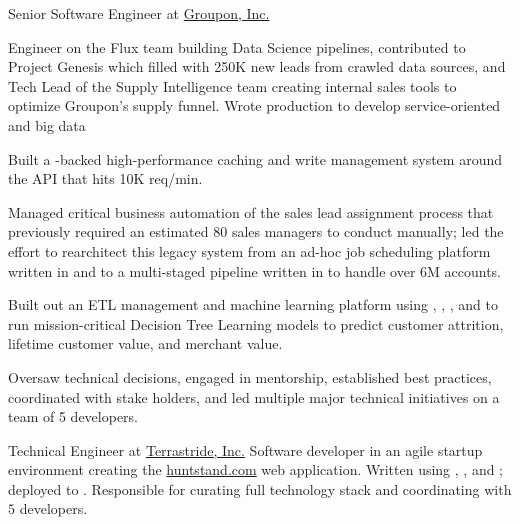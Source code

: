 \documentclass[10pt]{article}
\begin{document}
%
{Senior Software Engineer}%
{at}%
{\href{http://www.groupon.com}{Groupon, Inc.}}%
{Engineer on the Flux team building Data Science pipelines,
  contributed to Project Genesis which filled \salesforce with 250K
  new leads from crawled data sources, and Tech Lead of the Supply
  Intelligence team creating internal sales tools to optimize
  Groupon's supply funnel. Wrote production \clojure to develop
  service-oriented and big data
  \begin{exlist}

  \item Built a \postgres-backed high-performance caching and write
    management system around the \salesforce API that hits 10K
    req/min.

  \item Managed critical business automation of the sales lead
    assignment process that previously required an estimated 80
    sales managers to conduct manually; led the effort to
    rearchitect this legacy system from an ad-hoc job scheduling
    platform written in \ruby and \bash to a multi-staged \hadoop
    pipeline written in \clojure to handle over 6M accounts.



  \item Built out an ETL management and machine learning platform
    using \python, \clojure, \hive, and \spark to run
    mission-critical Decision Tree Learning models to predict
    customer attrition, lifetime customer value, and merchant
    value.

  \item Oversaw technical decisions, engaged in mentorship,
    established best practices, coordinated with stake holders, and
    led multiple major technical initiatives on a team of 5
    developers.
  \end{exlist}
}

%
{Technical Engineer}%
{at}%
{\href{http://www.terrastride.com/}{Terrastride, Inc.}}%
{Software developer in an agile startup environment creating the
  \href{http://www.huntstand.com}{huntstand.com} web application.
  Written using \python, \django, and \backbone; deployed to
  .  Responsible for curating full technology stack and
  coordinating with $5$ developers.}
\end{document}
